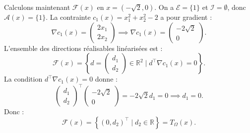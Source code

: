 Calculons maintenant $\mathcal{F}(x)$ en $x = (-\sqrt{2}, 0)$.
    On a $\mathcal{E} = \{1\}$ et $\mathcal{I} = \emptyset$, donc $\mathcal{A}(x) = \{1\}$. 
    La contrainte $c_1(x) = x_1^2 + x_2^2 - 2$ a pour gradient :
    \begin{equation}
        \nabla c_1(x) = \begin{pmatrix} 2x_1 \\ 2x_2 \end{pmatrix} \implies \nabla c_1(x) = \begin{pmatrix} -2\sqrt{2} \\ 0 \end{pmatrix}.
    \end{equation}
    L'ensemble des directions réalisables linéarisées est :
    \begin{equation}
        \mathcal{F}(x) = \left\{ d = \begin{pmatrix} d_1 \\ d_2 \end{pmatrix} \in \mathbb{R}^2 \mid d^\top \nabla c_1(x) = 0 \right\}.
    \end{equation}
    La condition $d^\top \nabla c_1(x) = 0$ donne :
    \begin{equation}
        \begin{pmatrix} d_1 \\ d_2 \end{pmatrix}^\top \begin{pmatrix} -2\sqrt{2} \\ 0 \end{pmatrix} = -2\sqrt{2} d_1 = 0 \implies d_1 = 0.
    \end{equation}
    Donc :
    \begin{equation}
        \mathcal{F}(x) = \left\{ (0, d_2)^\top \mid d_2 \in \mathbb{R} \right\} = T_\Omega(x).
    \end{equation}

